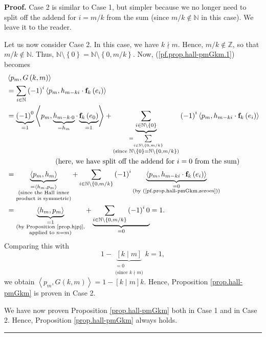 \documentclass[numbers=enddot,12pt,final,onecolumn,notitlepage]{scrartcl}%
\theoremstyle{definition}
\newenvironment{proof}[1][Proof]{\noindent\textbf{#1.} }{\ \rule{0.5em}{0.5em}}
\let\sumnonlimits\sum
\renewcommand{\sum}{\sumnonlimits\limits}
\newenvironment{verlong}{}{}
\newenvironment{vershort}{}{}
\begin{document}
\begin{proof}
\begin{vershort}
Case 2 is similar to Case 1, but simpler because we no longer need to split
off the addend for $i=m/k$ from the sum (since $m/k\notin\mathbb{N}$ in this
case). We leave it to the reader.
\end{vershort}

\begin{verlong}
Let us now consider Case 2. In this case, we have $k\nmid m$. Hence,
$m/k\notin\mathbb{Z}$, so that $m/k\notin\mathbb{N}$. Thus, $\mathbb{N}%
\setminus\left\{  0\right\}  =\mathbb{N}\setminus\left\{  0,m/k\right\}  $.
Now, (\ref{pf.prop.hall-pmGkm.1}) becomes%
\begin{align*}
&  \left\langle p_{m},G\left(  k,m\right)  \right\rangle \\
&  =\sum_{i\in\mathbb{N}}\left(  -1\right)  ^{i}\left\langle p_{m}%
,h_{m-ki}\cdot\mathbf{f}_{k}\left(  e_{i}\right)  \right\rangle \\
&  =\underbrace{\left(  -1\right)  ^{0}}_{=1}\left\langle p_{m}%
,\underbrace{h_{m-k\cdot0}}_{=h_{m}}\cdot\underbrace{\mathbf{f}_{k}\left(
e_{0}\right)  }_{=1}\right\rangle +\underbrace{\sum_{i\in\mathbb{N}%
\setminus\left\{  0\right\}  }}_{\substack{=\sum_{i\in\mathbb{N}%
\setminus\left\{  0,m/k\right\}  }\\\text{(since }\mathbb{N}\setminus\left\{
0\right\}  =\mathbb{N}\setminus\left\{  0,m/k\right\}  \text{)}}}\left(
-1\right)  ^{i}\left\langle p_{m},h_{m-ki}\cdot\mathbf{f}_{k}\left(
e_{i}\right)  \right\rangle \\
&  \ \ \ \ \ \ \ \ \ \ \ \ \ \ \ \ \ \ \ \ \left(  \text{here, we have split
off the addend for }i=0\text{ from the sum}\right) \\
&  =\underbrace{\left\langle p_{m},h_{m}\right\rangle }%
_{\substack{=\left\langle h_{m},p_{m}\right\rangle \\\text{(since the Hall
inner}\\\text{product is symmetric)}}}+\sum_{i\in\mathbb{N}\setminus\left\{
0,m/k\right\}  }\left(  -1\right)  ^{i}\underbrace{\left\langle p_{m}%
,h_{m-ki}\cdot\mathbf{f}_{k}\left(  e_{i}\right)  \right\rangle }%
_{\substack{=0\\\text{(by (\ref{pf.prop.hall-pmGkm.zeroes}))}}}\\
&  =\underbrace{\left\langle h_{m},p_{m}\right\rangle }%
_{\substack{=1\\\text{(by Proposition \ref{prop.hjpj},}\\\text{applied to
}n=m\text{)}}}+\underbrace{\sum_{i\in\mathbb{N}\setminus\left\{
0,m/k\right\}  }\left(  -1\right)  ^{i}0}_{=0}=1.
\end{align*}
Comparing this with%
\[
1-\underbrace{\left[  k\mid m\right]  }_{\substack{=0\\\text{(since }k\nmid
m\text{)}}}k=1,
\]
we obtain $\left\langle p_{m},G\left(  k,m\right)  \right\rangle =1-\left[
k\mid m\right]  k$. Hence, Proposition \ref{prop.hall-pmGkm} is proven in Case 2.
\end{verlong}

We have now proven Proposition \ref{prop.hall-pmGkm} both in Case 1 and in
Case 2. Hence, Proposition \ref{prop.hall-pmGkm} always holds.
\end{proof}
\end{document}
